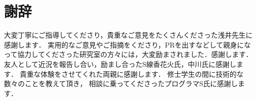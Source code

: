 \chapter*{謝辞}

大変丁寧にご指導してくださり，貴重なご意見をたくさんくださった浅井先生に感謝します．
実用的なご意見やご指摘をくださり，PRを出すなどして親身になって協力してくださった研究室の方々には，大変励まされました．感謝します．
友人として近況を報告し合い，励まし合ったS線香花火氏，中川氏に感謝します．
貴重な体験をさせてくれた両親に感謝します．
修士学生の間に技術的な数々のことを教えて頂き，
相談に乗ってくださったプログラマS氏に感謝します．
